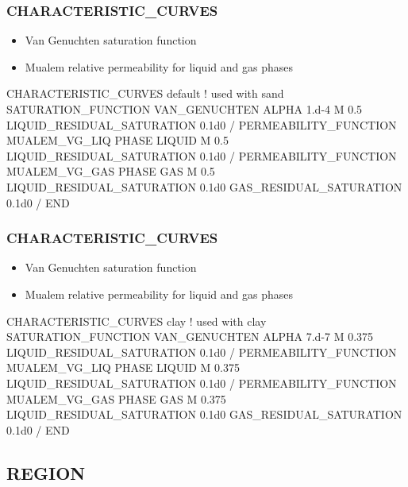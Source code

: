 \documentclass{beamer}
\newcommand\redcomment[1]{{{\color{red} #1}}}
\newcommand\bluecomment[1]{{{\color{blue} #1}}}
\newcommand\greencomment[1]{{{\color{green} #1}}}
\begin{document}
\begin{frame}\frametitle{CHARACTERISTIC\_CURVES}

\begin{itemize}\small
  \item Van Genuchten \redcomment{saturation function}
  \item Mualem \redcomment{relative permeability} for liquid and gas phases
\end{itemize}

\begin{semiverbatim}\small
CHARACTERISTIC_CURVES default \bluecomment{! used with} \greencomment{sand}
  SATURATION_FUNCTION VAN_GENUCHTEN
    ALPHA 1.d-4
    M 0.5
    LIQUID_RESIDUAL_SATURATION 0.1d0
  /
  PERMEABILITY_FUNCTION MUALEM_VG_LIQ
    PHASE LIQUID
    M 0.5
    LIQUID_RESIDUAL_SATURATION 0.1d0
  /
  PERMEABILITY_FUNCTION MUALEM_VG_GAS
    PHASE GAS
    M 0.5
    LIQUID_RESIDUAL_SATURATION 0.1d0
    GAS_RESIDUAL_SATURATION 0.1d0
  /
END
\end{semiverbatim}

\end{frame}

\begin{frame}\frametitle{CHARACTERISTIC\_CURVES}

\begin{itemize}\small
  \item Van Genuchten \redcomment{saturation function}
  \item Mualem \redcomment{relative permeability} for liquid and gas phases
\end{itemize}

\begin{semiverbatim}\small
CHARACTERISTIC_CURVES clay \bluecomment{! used with} \greencomment{clay}
  SATURATION_FUNCTION VAN_GENUCHTEN
    ALPHA 7.d-7
    M 0.375
    LIQUID_RESIDUAL_SATURATION 0.1d0
  /
  PERMEABILITY_FUNCTION MUALEM_VG_LIQ
    PHASE LIQUID
    M 0.375
    LIQUID_RESIDUAL_SATURATION 0.1d0
  /
  PERMEABILITY_FUNCTION MUALEM_VG_GAS
    PHASE GAS
    M 0.375
    LIQUID_RESIDUAL_SATURATION 0.1d0
    GAS_RESIDUAL_SATURATION 0.1d0
  /
END
\end{semiverbatim}

\end{frame}
\subsection{REGION}
\end{document}
